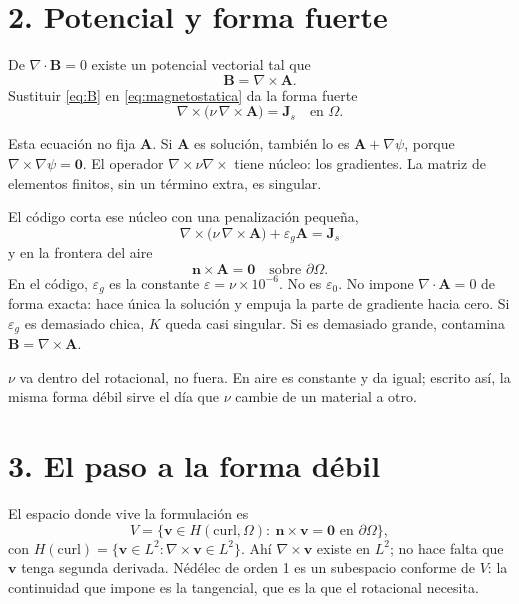 \documentclass[11pt]{article}
\newcommand{\curl}{\nabla\times}
\newcommand{\nv}{\nu}
\newcommand{\eg}{\varepsilon_{g}}
\newcommand{\bd}{\partial\Omega}
\begin{document}
\section*{2. Potencial y forma fuerte}

De \(\nabla\cdot\mathbf{B}=0\) existe un potencial vectorial tal que
\begin{equation}
\mathbf{B}=\curl\mathbf{A}.
\label{eq:B}
\end{equation}
Sustituir \eqref{eq:B} en \eqref{eq:magnetostatica} da la forma fuerte
\begin{equation}
\curl\bigl(\nv\,\curl\mathbf{A}\bigr)=\mathbf{J}_{s}
\quad\text{en }\Omega.
\label{eq:fuerte-singular}
\end{equation}

Esta ecuación no fija \(\mathbf{A}\). Si \(\mathbf{A}\) es solución, también lo es \(\mathbf{A}+\nabla\psi\), porque \(\curl\nabla\psi=\mathbf{0}\). El operador \(\curl\nv\curl\) tiene núcleo: los gradientes. La matriz de elementos finitos, sin un término extra, es singular.

El código corta ese núcleo con una penalización pequeña,
\begin{equation}
\boxed{\;
\curl\bigl(\nv\,\curl\mathbf{A}\bigr)+\eg\mathbf{A}=\mathbf{J}_{s}
\;}
\label{eq:fuerte}
\end{equation}
y en la frontera del aire
\begin{equation}
\mathbf{n}\times\mathbf{A}=\mathbf{0}
\quad\text{sobre }\bd.
\label{eq:bc}
\end{equation}
En el código, \(\eg\) es la constante \(\varepsilon=\nv\times 10^{-6}\). No es \(\varepsilon_0\). No impone \(\nabla\cdot\mathbf{A}=0\) de forma exacta: hace única la solución y empuja la parte de gradiente hacia cero. Si \(\eg\) es demasiado chica, \(K\) queda casi singular. Si es demasiado grande, contamina \(\mathbf{B}=\curl\mathbf{A}\).

\(\nv\) va dentro del rotacional, no fuera. En aire es constante y da igual; escrito así, la misma forma débil sirve el día que \(\nv\) cambie de un material a otro.

\section*{3. El paso a la forma débil}

El espacio donde vive la formulación es
\[
V=\bigl\{\mathbf{v}\in H(\mathrm{curl},\Omega):\ \mathbf{n}\times\mathbf{v}=\mathbf{0}\text{ en }\bd\bigr\},
\]
con \(H(\mathrm{curl})=\{\mathbf{v}\in L^{2}:\curl\mathbf{v}\in L^{2}\}\).
Ahí \(\curl\mathbf{v}\) existe en \(L^{2}\); no hace falta que \(\mathbf{v}\) tenga segunda derivada. Nédélec de orden 1 es un subespacio conforme de \(V\): la continuidad que impone es la tangencial, que es la que el rotacional necesita.
\end{document}
